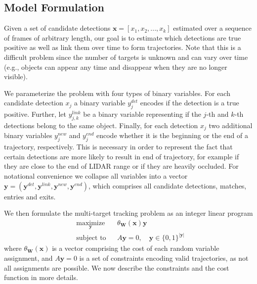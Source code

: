 \documentclass[letterpaper, 10 pt, conference]{ieeeconf}  \pdfminorversion=4
\newcommand{\binvarset}{\mathbf{y}}
\newcommand{\binvar}{y}
\newcommand{\obsvarset}{\mathbf{x}}
\newcommand{\obsvar}{x}
\newcommand{\weightset}{\mathbf{W}}
\newcommand{\modelfun}{\theta}
\newcommand{\bx}{\mathbf{x}}
\newcommand{\by}{\mathbf{y}}
\begin{document}
\subsection{Model Formulation}
\label{sc:structured_model}

Given a set of candidate detections $\bx = [\obsvar_1, \obsvar_2, ..., \obsvar_k]$ estimated over a sequence of frames of arbitrary length, our goal is to estimate which detections are true positive as well as link them over time to form trajectories.
Note that this is a difficult problem since  the number of targets is unknown and can vary over time (e.g., objects can appear any time and disappear when they are no longer visible).

We parameterize the problem with four types of binary variables. For each candidate detection $x_j$ a binary variable $\binvar^{det}_{j}$  encodes if the detection is a true positive. Further, let $\binvar^{link}_{j,k}$ be a binary variable representing  if the $j$-th and $k$-th detections belong to the same object. Finally, for each detection $x_j$ two additional binary variables $\binvar^{new}_{j}$ and $\binvar^{end}_{j}$  encode whether it is the beginning or the end of a trajectory, respectively. This is necessary in order to represent the fact that certain detections are more likely to result in end of trajectory,  for example if they are close to the end of LIDAR range or if they are heavily occluded.
For notational convenience we collapse all  variables  into a vector  $\allowbreak \by = (\binvarset^{det}, \binvarset^{link}, \binvarset^{new}, \binvarset^{end})$, which comprises all candidate detections, matches, entries and exits.

We then formulate the multi-target tracking problem as an integer linear program
\begin{equation*}
\label{eq:blank_lp1}
  \begin{aligned}
  & \underset{\binvarset}{\text{maximize}}
    & & \modelfun_\weightset(\obsvarset) \binvarset \\
  & \text{subject to}
    & & A \binvarset = 0,
\quad \by \in \{0, 1\}^{|\by|}\ \end{aligned}
\end{equation*}
where $\modelfun_{\weightset}(\bx)$ is a vector comprising the cost of each random variable assignment, and $A\by=0$ is a set of constraints encoding valid trajectories, as not all assignments are possible.
We now describe the constraints and the cost function in more details.
\end{document}

